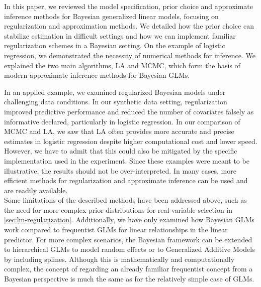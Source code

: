 In this paper, we reviewed the model specification, prior choice and approximate inference methods for Bayesian generalized linear models, focusing on regularization and approximation methods.
We detailed how the prior choice can stabilize estimation in difficult settings and how we can implement familiar regularization schemes  in a Bayesian setting.
On the example of logistic regression, we demonstrated the necessity of numerical methods for inference. We explained the two main algorithms, LA and MCMC, which form the basis of modern approximate inference methods for Bayesian GLMs.

In an applied example, we examined regularized Bayesian models under challenging data conditions.
In our synthetic data setting, regularization improved predictive performance and reduced the number of covariates falsely as informative declared, particularly in logistic regression.
In our comparison of MCMC and LA, we saw that LA often provides more accurate and precise estimates in logistic regression despite higher computational cost and lower speed. However, we have to admit that this could also be mitigated by the specific implementation used in the experiment.
Since these examples were meant to be illustrative, the results should not be over-interpreted.
In many cases, more efficient methods for regularization and approximate inference can be used and are readily available.\\

Some limitations of the described methods have been addressed above, such as the need for more complex prior distributions for real variable selection in \autoref{sec:lm-regularization}.
Additionally, we have only examined how Bayesian GLMs work compared to frequentist GLMs for linear relationships in the linear predictor.
For more complex scenarios, the Bayesian framework can be extended to hierarchical GLMs to model random effects or to Generalized Additive Models by including splines.
Although this is mathematically and computationally complex, the concept of regarding an already familiar frequentist concept from a Bayesian perspective is much the same as for the relatively simple case of GLMs.
